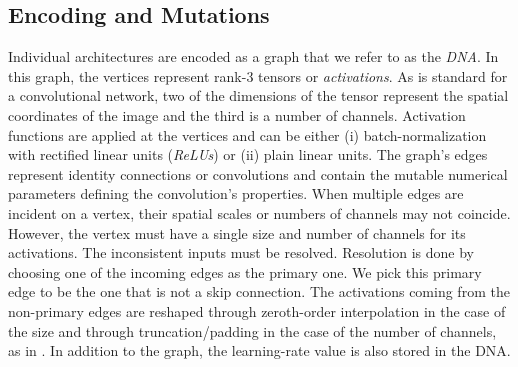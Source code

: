 \documentclass{article}
\renewcommand{\cite}[1]{\citep{#1}}
\begin{document}
\subsection{Encoding and Mutations}
\label{encoding_and_mutations_section}

Individual architectures are encoded as a graph that we refer to as the {\em DNA}. In this graph, the vertices represent \mbox{rank-3} tensors or {\em activations}. As is standard for a convolutional network, two of the dimensions of the tensor represent the spatial coordinates of the image and the third is a number of channels. Activation functions are applied at the vertices and can be either (i) batch-normalization \cite{ioffe2015batch} with rectified linear units ({\em ReLUs}) or (ii) plain linear units. The graph's edges represent identity connections or convolutions and contain the mutable numerical parameters defining the convolution's properties. When multiple edges are incident on a vertex, their spatial scales or numbers of channels may not coincide. However, the vertex must have a single size and number of channels for its activations. The inconsistent inputs must be resolved. Resolution is done by choosing one of the incoming edges as the primary one. We pick this primary edge to be the one that is not a skip connection. The activations coming from the non-primary edges are reshaped through zeroth-order interpolation in the case of the size and through truncation/padding in the case of the number of channels, as in \citet{he2016deep}. In addition to the graph, the learning-rate value is also stored in the DNA.
\end{document}
